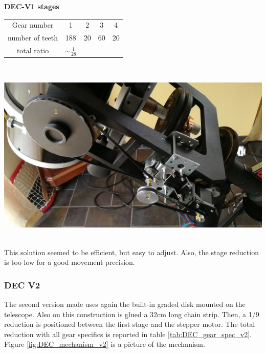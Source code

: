 \documentclass{article}
\begin{document}
\begin{multicols}{2}
        \begin{minipage}
            {0.5\textwidth}
            \centering
            \textbf{DEC-V1 stages}\\
            \begin{tabular}{ccccc}
                \hline
                Gear number & 1 & 2 & 3 & 4 \\
                number of teeth & 188 & 20 & 60 & 20 \\
                \hline
                total ratio & \(\sim \frac{1}{28}\) &&&
            \end{tabular}
            \label{tab:DEC_gear_spec}
        \end{minipage}
        \\
        \begin{minipage}
            {0.5\textwidth}
            \centering
            \includegraphics[scale=.28]{DEC_motorization.jpg}
            \label{fig:DEC_mechanism}
        \end{minipage}
        \\
        This solution seemed to be efficient, but easy to adjust.
        Also, the stage reduction is too low for a good movement precision.

        \subsubsection{DEC V2}
        The second version made uses again the built-in graded disk mounted on the telescope.
        Also on this construction is glued a 32cm long chain strip.
        Then, a 1/9 reduction is positioned between the first stage and the stepper motor.
        The total reduction with all gear specifics is reported in table \ref{tab:DEC_gear_spec_v2}.
        Figure \ref{fig:DEC_mechanism_v2} is a picture of the mechanism.


\end{multicols}
\end{document}
